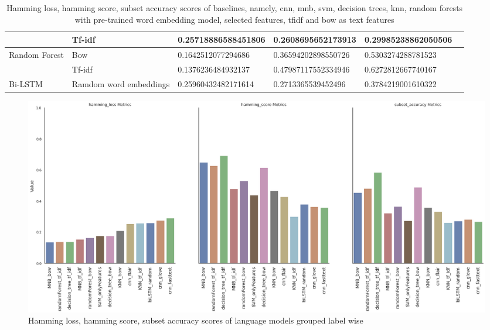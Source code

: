 \begin{table}[h!]
{\begin{tabular}{@{}llrrrr@{}}
\multicolumn{1}{|l|}{} &
  \multicolumn{1}{l|}{Tf-idf} &
  \multicolumn{1}{l|}{0.25718886588451806} &
  \multicolumn{1}{l|}{0.2608695652173913} &
  \multicolumn{1}{l|}{0.29985238862050506}  \\ \midrule
\multicolumn{1}{|l|}{\multirow{2}{*}{Random Forest}} &
  \multicolumn{1}{l|}{Bow} &
  \multicolumn{1}{l|}{0.1642512077294686} &
  \multicolumn{1}{l|}{0.36594202898550726} &
  \multicolumn{1}{l|}{0.5303274288781523} & \\ \cmidrule(l){2-5}
\multicolumn{1}{|l|}{} &
  \multicolumn{1}{l|}{Tf-idf} &
  \multicolumn{1}{l|}{0.1376236484932137} &
  \multicolumn{1}{l|}{0.47987117552334946} &
  \multicolumn{1}{l|}{0.6272812667740167} & \\ \midrule
\multicolumn{1}{|l|}{Bi-LSTM} &
  \multicolumn{1}{l|}{Ramdom word embeddings} &
  \multicolumn{1}{l|}{0.25960432482171614} &
  \multicolumn{1}{l|}{0.2713365539452496} &
  \multicolumn{1}{l|}{0.3784219001610322} \\ \bottomrule
\end{tabular}%
}
\caption{Hamming loss, hamming score, subset accuracy scores of baselines, namely, \acrfull{cnn}, \acrfull{mnb}, \acrfull{svm}, decision trees, \acrfull{knn}, random forests with pre-trained word embedding model, selected features, \acrfull{tfidf} and \acrfull{bow} as text features}
\label{tab:sample_based_baseline}
\end{table}

\begin{figure}[h!]
    \centering
    \includegraphics[width=1\textwidth]{thesis/figures/HHAA_final.png}
    \caption{Hamming loss, hamming score, subset accuracy scores of language models grouped label wise}
    \label{fig:label_wise_group_baselines}
\end{figure}

